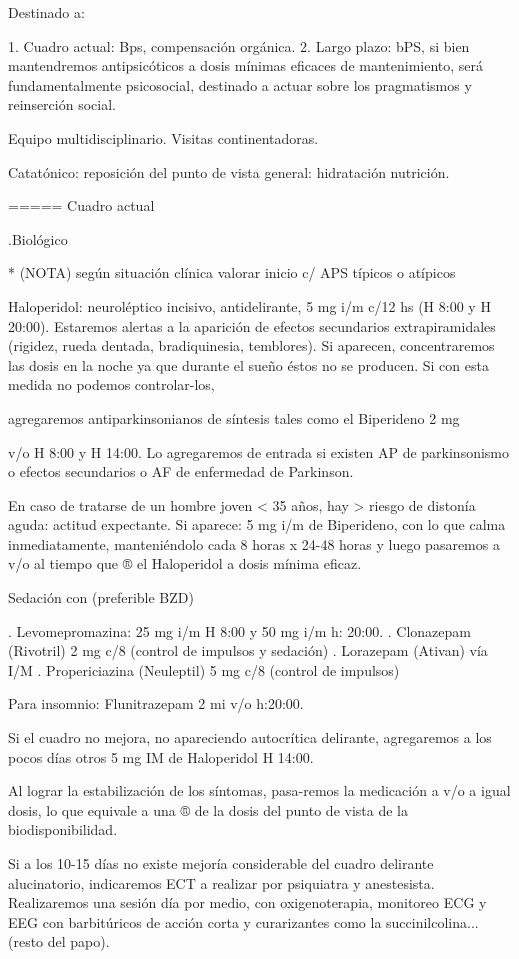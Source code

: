 \documentclass[encares.tex]{subfiles}
\begin{document}
Destinado a:

1. Cuadro actual: Bps, compensación orgánica.
2. Largo plazo: bPS, si bien mantendremos antipsicóticos a dosis mínimas eficaces de mantenimiento, será fundamentalmente psicosocial, destinado a actuar sobre los pragmatismos y reinserción social.

Equipo multidisciplinario. Visitas continentadoras.

Catatónico: reposición del punto de vista general: hidratación nutrición.

===== Cuadro actual

.Biológico

* (NOTA) según situación clínica valorar inicio c/ APS típicos o atípicos

Haloperidol: neuroléptico incisivo, antidelirante, 5 mg i/m c/12 hs (H 8:00 y H 20:00). Estaremos alertas a la aparición de efectos secundarios extrapiramidales (rigidez, rueda dentada, bradiquinesia, temblores). Si aparecen, concentraremos las dosis en la noche ya que durante el sueño éstos no se producen. Si con esta medida no podemos controlar-los,

agregaremos antiparkinsonianos de síntesis tales como el Biperideno 2 mg

v/o H 8:00 y H 14:00. Lo agregaremos de entrada si existen AP de parkinsonismo o efectos secundarios o AF de enfermedad de Parkinson.

En caso de tratarse de un hombre joven < 35 años, hay > riesgo de distonía aguda: actitud expectante. Si aparece: 5 mg i/m de Biperideno, con lo que calma inmediatamente, manteniéndolo cada 8 horas x 24-48 horas y luego pasaremos a v/o al tiempo que ® el Haloperidol a dosis mínima eficaz.

Sedación con (preferible BZD)

. Levomepromazina: 25 mg i/m H 8:00 y 50 mg i/m h: 20:00.
. Clonazepam (Rivotril) 2 mg c/8 (control de impulsos y sedación)
. Lorazepam (Ativan) vía I/M
. Propericiazina (Neuleptil) 5 mg c/8 (control de impulsos)

Para insomnio: Flunitrazepam 2 mi v/o h:20:00.

Si el cuadro no mejora, no apareciendo autocrítica delirante, agregaremos a los pocos días otros 5 mg IM de Haloperidol H 14:00.

Al lograr la estabilización de los síntomas, pasa-remos la medicación a v/o a igual dosis, lo que equivale a una ® de la dosis del punto de vista de la biodisponibilidad.

Si a los 10-15 días no existe mejoría considerable del cuadro delirante alucinatorio, indicaremos ECT a realizar por psiquiatra y anestesista. Realizaremos una sesión día por medio, con oxigenoterapia, monitoreo ECG y EEG con barbitúricos de acción corta y curarizantes como la succinilcolina... (resto del papo).
\end{document}
